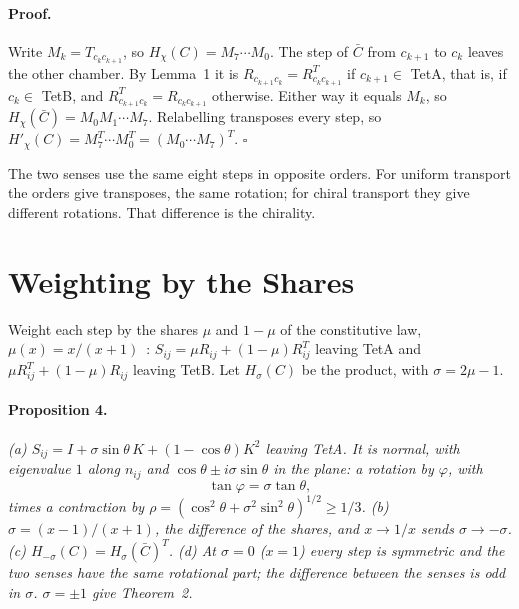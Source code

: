 \documentclass[twocolumn]{iopjournal}
\begin{document}
\paragraph{Proof.} Write $M_k = T_{c_kc_{k+1}}$, so
$H_\chi(C) = M_7\cdots M_0$. The step of $\bar C$ from $c_{k+1}$ to
$c_k$ leaves the other chamber. By Lemma~1 it is
$R_{c_{k+1}c_k} = R_{c_kc_{k+1}}^T$ if $c_{k+1} \in$ TetA, that is,
if $c_k \in$ TetB, and $R_{c_{k+1}c_k}^T = R_{c_kc_{k+1}}$ otherwise.
Either way it equals $M_k$, so $H_\chi(\bar C) = M_0M_1\cdots M_7$.
Relabelling transposes every step, so
$H'_\chi(C) = M_7^T\cdots M_0^T = (M_0\cdots M_7)^T$.
\hfill $\square$

\medskip
\noindent
The two senses use the same eight steps in opposite orders. For
uniform transport the orders give transposes, the same rotation; for
chiral transport they give different rotations. That difference is
the chirality.


\section*{Weighting by the Shares}

Weight each step by the shares $\mu$ and $1-\mu$ of the constitutive
law, $\mu(x) = x/(x+1)$~\cite{Exchange}: $S_{ij} = \mu R_{ij} +
(1-\mu)R_{ij}^T$ leaving TetA and $\mu R_{ij}^T + (1-\mu)R_{ij}$
leaving TetB. Let $H_\sigma(C)$ be the product, with
$\sigma = 2\mu - 1$.

\paragraph{Proposition 4.} \textit{(a) $S_{ij} = I +
\sigma\sin\theta\,K + (1-\cos\theta)K^2$ leaving TetA. It is normal,
with eigenvalue $1$ along $n_{ij}$ and $\cos\theta \pm
i\sigma\sin\theta$ in the plane: a rotation by $\varphi$, with}
\begin{equation}
  \tan\varphi = \sigma\tan\theta ,
  \label{eq:phi}
\end{equation}
\textit{times a contraction by $\rho = (\cos^2\theta +
\sigma^2\sin^2\theta)^{1/2} \ge 1/3$. (b) $\sigma = (x-1)/(x+1)$, the
difference of the shares, and $x \to 1/x$ sends $\sigma \to -\sigma$.
(c) $H_{-\sigma}(C) = H_\sigma(\bar C)^T$. (d) At $\sigma = 0$
($x = 1$) every step is symmetric and the two senses have the same
rotational part; the difference between the senses is odd in
$\sigma$. $\sigma = \pm1$ give Theorem~2.}
\end{document}
